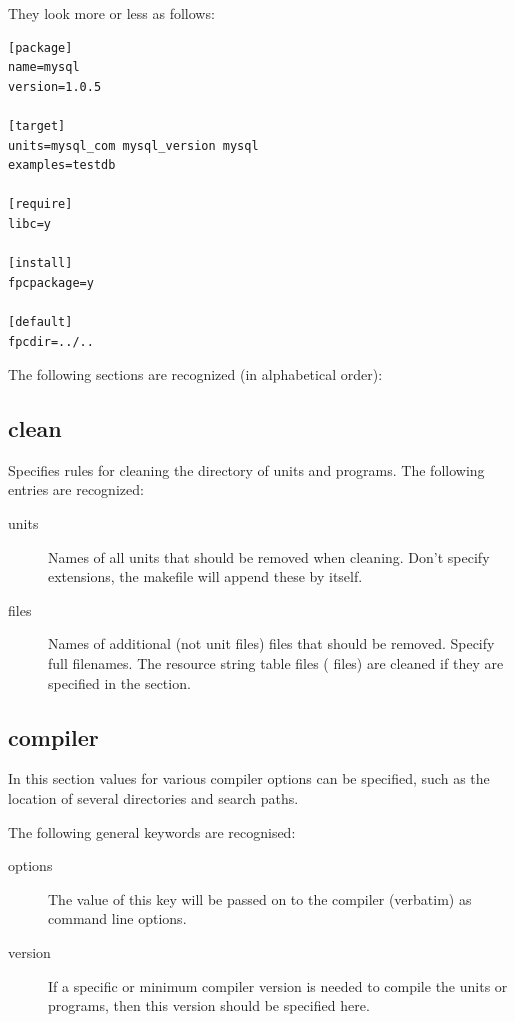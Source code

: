 They look more or less as follows:
\begin{verbatim}
[package]
name=mysql
version=1.0.5

[target]
units=mysql_com mysql_version mysql
examples=testdb

[require]
libc=y

[install]
fpcpackage=y

[default]
fpcdir=../..
\end{verbatim}

The following sections are recognized (in alphabetical order):

\subsection{clean}
Specifies rules for cleaning the directory of units and programs.
The following entries are recognized:
\begin{description}
\item[units] Names of all units that should be removed when cleaning.
Don't specify extensions, the makefile will append these by itself.
\item[files] Names of additional (not unit files) files that should
be removed. Specify full filenames. The resource string table files
( files) are cleaned if they are specified in the  section.
\end{description}

\subsection{compiler}
In this section values for various compiler options can be specified, 
such as the location of several directories and search paths.

The following general keywords are recognised:
\begin{description}
\item[options] The value of this key will be passed on to the compiler
(verbatim) as command line options.
\item[version] If a specific or minimum compiler version is needed to
compile the units or programs, then this version should be specified here.
\end{description}

